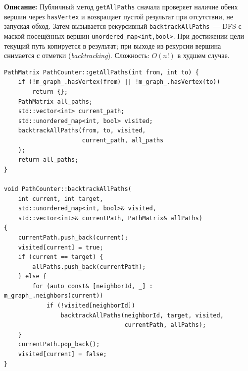 \textbf{Описание:} Публичный метод \texttt{getAllPaths} сначала проверяет
наличие обеих вершин через \texttt{hasVertex} и возвращает пустой результат
при отсутствии, не запуская обход. Затем вызывается рекурсивный
\texttt{backtrackAllPaths}~--- DFS с маской посещённых вершин
\texttt{unordered\_map<int,bool>}. При достижении цели текущий путь
копируется в результат; при выходе из рекурсии вершина снимается с
отметки (\emph{backtracking}). Сложность: $O(n!)$ в худшем случае.

\begin{lstlisting}[style=cppstyle, caption={Backtracking-поиск маршрутов (PathCounter.cc)}]
PathMatrix PathCounter::getAllPaths(int from, int to) {
    if (!m_graph_.hasVertex(from) || !m_graph_.hasVertex(to))
        return {};
    PathMatrix all_paths;
    std::vector<int> current_path;
    std::unordered_map<int, bool> visited;
    backtrackAllPaths(from, to, visited,
                      current_path, all_paths
    );
    return all_paths;
}

void PathCounter::backtrackAllPaths(
    int current, int target,
    std::unordered_map<int, bool>& visited,
    std::vector<int>& currentPath, PathMatrix& allPaths)
{
    currentPath.push_back(current);
    visited[current] = true;
    if (current == target) {
        allPaths.push_back(currentPath);
    } else {
        for (auto const& [neighborId, _] : m_graph_.neighbors(current))
            if (!visited[neighborId])
                backtrackAllPaths(neighborId, target, visited,
                                  currentPath, allPaths);
    }
    currentPath.pop_back();
    visited[current] = false;
}
\end{lstlisting}
